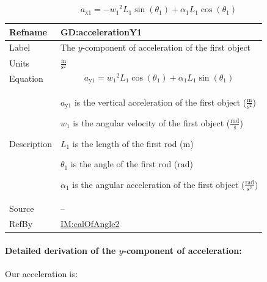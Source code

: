 \documentclass[12pt]{article}
\begin{document}
\begin{displaymath}
{a_{\text{x}1}}=-{w_{1}}^{2} {L_{1}} \sin\left({θ_{1}}\right)+{α_{1}} {L_{1}} \cos\left({θ_{1}}\right)
\end{displaymath}
\vspace{\baselineskip}
\noindent
\begin{minipage}{\textwidth}
\begin{tabular}{>{\raggedright}p{}>{\raggedright\arraybackslash}p{}}
\toprule \textbf{Refname} & \textbf{GD:accelerationY1}
\label{GD:accelerationY1}
\\ \midrule
Label & The $y$-component of acceleration of the first object
        
\\ \midrule
Units & $\frac{\text{m}}{\text{s}^{2}}$
        
\\ \midrule
Equation & \begin{displaymath}
           {a_{\text{y}1}}={w_{1}}^{2} {L_{1}} \cos\left({θ_{1}}\right)+{α_{1}} {L_{1}} \sin\left({θ_{1}}\right)
           \end{displaymath}
\\ \midrule
Description & \begin{symbDescription}
              \item{${a_{\text{y}1}}$ is the vertical acceleration of the first object ($\frac{\text{m}}{\text{s}^{2}}$)}
              \item{${w_{1}}$ is the angular velocity of the first object ($\frac{\text{rad}}{\text{s}}$)}
              \item{${L_{1}}$ is the length of the first rod (${\text{m}}$)}
              \item{${θ_{1}}$ is the angle of the first rod (${\text{rad}}$)}
              \item{${α_{1}}$ is the angular acceleration of the first object ($\frac{\text{rad}}{\text{s}^{2}}$)}
              \end{symbDescription}
\\ \midrule
Source & --
         
\\ \midrule
RefBy & \hyperref[IM:calOfAngle2]{IM:calOfAngle2}
        
\\ \bottomrule
\end{tabular}
\end{minipage}
\paragraph{Detailed derivation of the $y$-component of acceleration:}
\label{GD:accelerationY1Deriv}
Our acceleration is:
\end{document}
